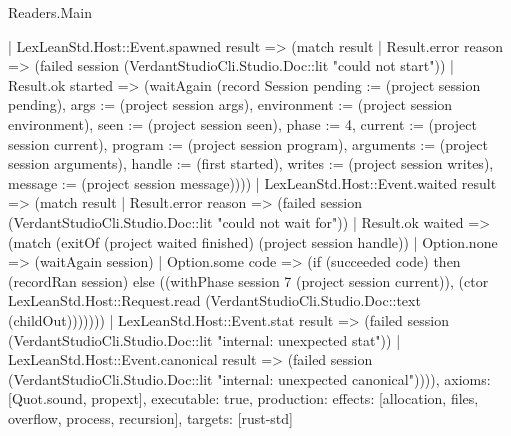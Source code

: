 \begin{lexlean}{Readers.Main}
\begin{semanticmodule}
{    | LexLeanStd.Host::Event.spawned result => (match result
      | Result.error reason => (failed session (VerdantStudioCli.Studio.Doc::lit "could not start"))
      | Result.ok started => (waitAgain (record Session {pending := (project session pending), args := (project session args), environment := (project session environment), seen := (project session seen), phase := 4, current := (project session current), program := (project session program), arguments := (project session arguments), handle := (first started), writes := (project session writes), message := (project session message)})))
    | LexLeanStd.Host::Event.waited result => (match result
      | Result.error reason => (failed session (VerdantStudioCli.Studio.Doc::lit "could not wait for"))
      | Result.ok waited => (match (exitOf (project waited finished) (project session handle))
        | Option.none => (waitAgain session)
        | Option.some code => (if (succeeded code) then (recordRan session) else ((withPhase session 7 (project session current)), (ctor LexLeanStd.Host::Request.read (VerdantStudioCli.Studio.Doc::text (childOut)))))))
    | LexLeanStd.Host::Event.stat result => (failed session (VerdantStudioCli.Studio.Doc::lit "internal: unexpected stat"))
    | LexLeanStd.Host::Event.canonical result => (failed session (VerdantStudioCli.Studio.Doc::lit "internal: unexpected canonical")))),
  axioms: [Quot.sound, propext],
  executable: true,
  production: {effects: [allocation, files, overflow, process, recursion], targets: [rust-std]}
}
\end{semanticmodule}
\end{lexlean}
